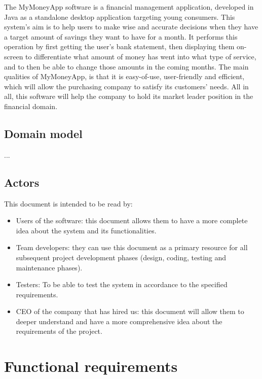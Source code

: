\documentclass[letterpaper]{article}
\begin{document}
		The MyMoneyApp software is a financial management application, developed in Java as a standalone desktop application targeting young consumers. This system’s aim is to help users to make wise and accurate decisions when they have a target amount of savings they want to have for a month. It performs this operation by first getting the user’s bank statement, then displaying them on-screen to differentiate what amount of money has went into what type of service, and to then be able to change those amounts in the coming months. The main qualities of MyMoneyApp, is that it is easy-of-use, user-friendly and efficient, which will allow the purchasing company to satisfy its customers’ needs. All in all, this software will help the company to hold its market leader position in the financial domain.
	
	\subsection{Domain model}
	
		...
	
	\subsection{Actors}
	
		This document is intended to be read by:
		
		\begin{itemize}
			
			\item Users of the software: this document allows them to have a more complete idea about the system and its functionalities.
			
			\item Team developers: they can use this document as a primary resource for all subsequent project development phases (design, coding, testing and maintenance phases).
			
			\item Testers: To be able to test the system in accordance to the specified requirements.
			
			\item CEO of the company that has hired us: this document will allow them to deeper understand and have a more comprehensive idea about the requirements of the project.
			
		\end{itemize}

\section{Functional requirements}
\end{document}
